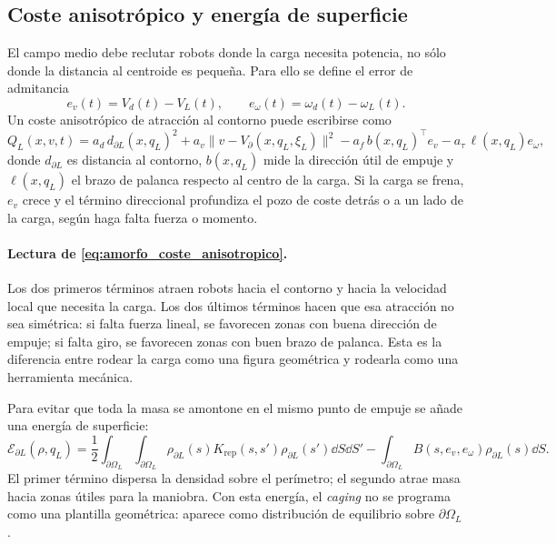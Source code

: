 \subsection{Coste anisotrópico y energía de superficie}
\label{subsec:amorfo-coste}

El campo medio debe reclutar robots donde la carga necesita potencia, no sólo donde la
distancia al centroide es pequeña. Para ello se define el error de admitancia
\begin{equation}
  e_v(t)=V_d(t)-V_L(t),
  \qquad
  e_\omega(t)=\omega_d(t)-\omega_L(t).
  \label{eq:amorfo_error_admitancia}
\end{equation}
Un coste anisotrópico de atracción al contorno puede escribirse como
\begin{equation}
  Q_L(x,v,t)
  =
  a_d\,d_{\partial L}(x,q_L)^2
  +
  a_v\|v-V_{\partial}(x,q_L,\xi_L)\|^2
  -
  a_f\,b(x,q_L)^\top e_v
  -
  a_\tau\,\ell(x,q_L)e_\omega ,
  \label{eq:amorfo_coste_anisotropico}
\end{equation}
donde $d_{\partial L}$ es distancia al contorno, $b(x,q_L)$ mide la dirección útil de
empuje y $\ell(x,q_L)$ el brazo de palanca respecto al centro de la carga. Si la carga se
frena, $e_v$ crece y el término direccional profundiza el pozo de coste detrás o a un
lado de la carga, según haga falta fuerza o momento.

\paragraph{Lectura de \eqref{eq:amorfo_coste_anisotropico}.}
Los dos primeros términos atraen robots hacia el contorno y hacia la velocidad local que
necesita la carga. Los dos últimos términos hacen que esa atracción no sea simétrica: si
falta fuerza lineal, se favorecen zonas con buena dirección de empuje; si falta giro, se
favorecen zonas con buen brazo de palanca. Esta es la diferencia entre rodear la carga
como una figura geométrica y rodearla como una herramienta mecánica.

Para evitar que toda la masa se amontone en el mismo punto de empuje se añade una energía
de superficie:
\begin{equation}
  \mathcal E_{\partial L}(\rho,q_L)
  =
  \frac12
  \int_{\partial\Omega_L}\!\!\int_{\partial\Omega_L}
  \rho_{\partial L}(s)K_{\mathrm{rep}}(s,s')
  \rho_{\partial L}(s')\dd S\dd S'
  -
  \int_{\partial\Omega_L}B(s,e_v,e_\omega)\rho_{\partial L}(s)\dd S .
  \label{eq:amorfo_energia_superficie}
\end{equation}
El primer término dispersa la densidad sobre el perímetro; el segundo atrae masa hacia
zonas útiles para la maniobra. Con esta energía, el \emph{caging} no se programa como una
plantilla geométrica: aparece como distribución de equilibrio sobre $\partial\Omega_L$.

